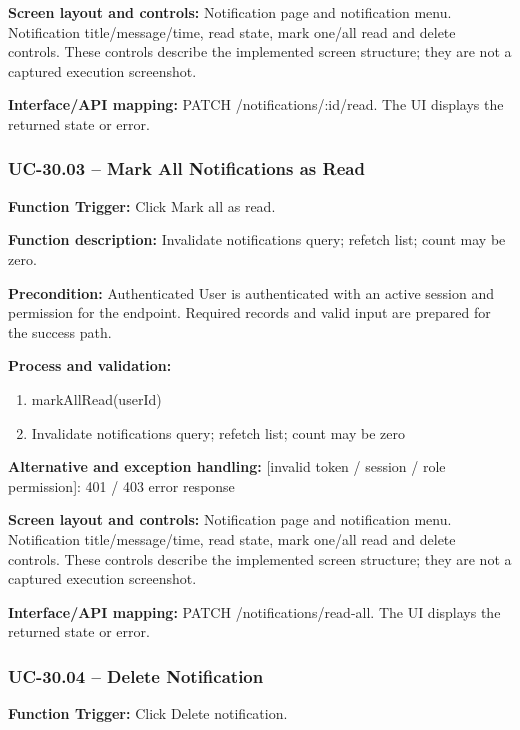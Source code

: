 \textbf{Screen layout and controls:} Notification page and notification menu. Notification title/\allowbreak{}message/\allowbreak{}time, read state, mark one/\allowbreak{}all read and delete controls. These controls describe the implemented screen structure; they are not a captured execution screenshot.

\textbf{Interface/\allowbreak{}API mapping:} PATCH /\allowbreak{}notifications/\allowbreak{}:id/\allowbreak{}read. The UI displays the returned state or error.

\subsubsection{UC-30.03 -- Mark All Notifications as Read}
\textbf{Function Trigger:} Click Mark all as read.

\textbf{Function description:} Invalidate notifications query; refetch list; count may be zero.

\textbf{Precondition:} Authenticated User is authenticated with an active session and permission for the endpoint. Required records and valid input are prepared for the success path.

\textbf{Process and validation:}
\begin{enumerate}
\item mark\allowbreak{}All\allowbreak{}Read(user\allowbreak{}Id)
\item Invalidate notifications query; refetch list; count may be zero
\end{enumerate}
\textbf{Alternative and exception handling:} [invalid token /\allowbreak{} session /\allowbreak{} role permission]: 401 /\allowbreak{} 403 error response

\textbf{Screen layout and controls:} Notification page and notification menu. Notification title/\allowbreak{}message/\allowbreak{}time, read state, mark one/\allowbreak{}all read and delete controls. These controls describe the implemented screen structure; they are not a captured execution screenshot.

\textbf{Interface/\allowbreak{}API mapping:} PATCH /\allowbreak{}notifications/\allowbreak{}read-all. The UI displays the returned state or error.

\subsubsection{UC-30.04 -- Delete Notification}
\textbf{Function Trigger:} Click Delete notification.

